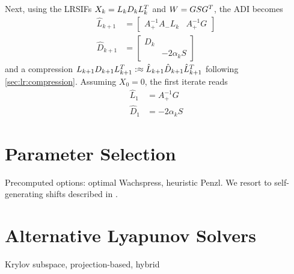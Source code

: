 
Next, using the \acp{LRSIF} $X_k = L_k D_k L_k^T$ and $W = GSG^T$,
the \ac{ADI} becomes
\begin{align*}
  \hat L_{k+1} &= \begin{bmatrix}
    A_+^{-1} A_- L_k &
    A_+^{-1} G
  \end{bmatrix} \\
  \hat D_{k+1} &= \begin{bmatrix}
    D_k \\
    & -2\alpha_k S
  \end{bmatrix}
\end{align*}
and a compression $L_{k+1} D_{k+1} L_{k+1}^T :\approx \hat L_{k+1} \hat D_{k+1} \hat L_{k+1}^T$
following \autoref{sec:lr:compression}.
Assuming $X_0 = 0$, the first iterate reads
\begin{align*}
  \hat L_1 &= A_+^{-1} G \\
  \hat D_1 &= -2\alpha_k S
\end{align*}


\section{Parameter Selection}

Precomputed options:
optimal Wachspress,
heuristic Penzl.
We resort to self-generating shifts described in \cite[Section~5.3]{Kuerschner2016}.

\section{Alternative Lyapunov Solvers}
Krylov subspace,
projection-based,
hybrid
